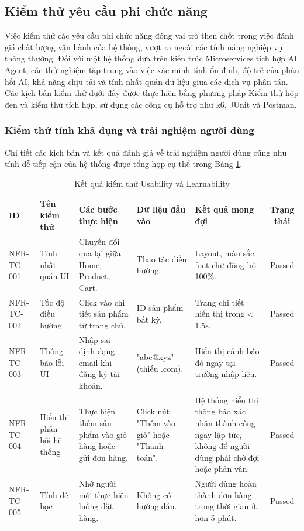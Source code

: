 \subsection{Kiểm thử yêu cầu phi chức năng}

Việc kiểm thử các yêu cầu phi chức năng đóng vai trò then chốt trong việc đánh giá chất lượng vận hành của hệ thống, vượt ra ngoài các tính năng nghiệp vụ thông thường. Đối với một hệ thống dựa trên kiến trúc Microservices tích hợp AI Agent, các thử nghiệm tập trung vào việc xác minh tính ổn định, độ trễ của phản hồi AI, khả năng chịu tải và tính nhất quán dữ liệu giữa các dịch vụ phân tán. Các kịch bản kiểm thử dưới đây được thực hiện bằng phương pháp Kiểm thử hộp đen và kiểm thử tích hợp, sử dụng các công cụ hỗ trợ như k6, JUnit và Postman.

\subsubsection{Kiểm thử tính khả dụng và trải nghiệm người dùng}

Chi tiết các kịch bản và kết quả đánh giá về trải nghiệm người dùng cũng như tính dễ tiếp cận của hệ thống được tổng hợp cụ thể trong Bảng \ref{tab:usability_expanded}.

\begin{table}[H]
\centering
\caption{Kết quả kiểm thử Usability và Learnability}
\label{tab:usability_expanded}
\small
\begin{tabularx}{\textwidth}{|l|X|X|X|X|c|}
\hline
\textbf{ID} & \textbf{Tên kiểm thử} & \textbf{Các bước thực hiện} & \textbf{Dữ liệu đầu vào} & \textbf{Kết quả mong đợi} & \textbf{Trạng thái} \\ \hline
NFR-TC-001 & Tính nhất quán UI & Chuyển đổi qua lại giữa Home, Product, Cart. & Thao tác điều hướng. & Layout, màu sắc, font chữ đồng bộ 100\%. & Passed \\ \hline
NFR-TC-002 & Tốc độ điều hướng & Click vào chi tiết sản phẩm từ trang chủ. & ID sản phẩm bất kỳ. & Trang chi tiết hiển thị trong < 1.5s. & Passed \\ \hline
NFR-TC-003 & Thông báo lỗi UI & Nhập sai định dạng email khi đăng ký tài khoản. & "abc@xyz" (thiếu .com). & Hiển thị cảnh báo đỏ ngay tại trường nhập liệu. & Passed \\ \hline
NFR-TC-004 & Hiển thị phản hồi hệ thống & Thực hiện thêm sản phẩm vào giỏ hàng hoặc gửi đơn hàng. & Click nút "Thêm vào giỏ" hoặc "Thanh toán". & Hệ thống hiển thị thông báo xác nhận thành công ngay lập tức, không để người dùng phải chờ đợi hoặc phân vân. & Passed \\ \hline
NFR-TC-005 & Tính dễ học & Nhờ người mới thực hiện luồng đặt hàng. & Không có hướng dẫn. & Người dùng hoàn thành đơn hàng trong thời gian ít hơn 5 phút. & Passed \\ \hline
\end{tabularx}
\end{table}

